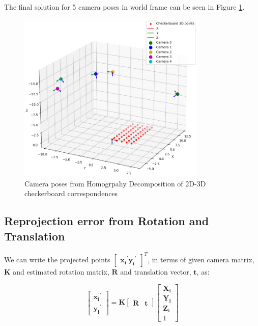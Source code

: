 \documentclass{article}
\begin{document}
The final solution for 5 camera poses in world frame can be seen in Figure \ref{fig:env_cam_frame}.

\begin{figure}[h]
    \centering
    \includegraphics[width=0.8\textwidth]{images/env_cam_frame.png}
    \caption{Camera poses from Homogrpahy Decomposition of 2D-3D checkerboard correspondences}
    \label{fig:env_cam_frame}
\end{figure}



\subsection{Reprojection error from Rotation and Translation}
We can write the projected points $\begin{bmatrix} \mathbf{x_i}^{'} \mathbf{y_i}^{'} \end{bmatrix}^T$, in terms of given camera matrix, $\mathbf{K}$ and estimated rotation matrix, 
$\mathbf{R}$ and translation vector, $\mathbf{t}$, as:

\begin{equation}
    \begin{bmatrix} \mathbf{x_i}^{'} \\ \mathbf{y_i}^{'} \end{bmatrix} = \mathbf{K} \begin{bmatrix} \mathbf{R} & \mathbf{t} \end{bmatrix} \begin{bmatrix} \mathbf{X_i} \\ \mathbf{Y_i} \\ \mathbf{Z_i} \\ 1 \end{bmatrix}
\end{equation}
\end{document}
